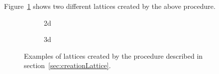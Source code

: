 
Figure~\ref{fig:examplesLattices} shows two different lattices created by the above procedure.

\begin{figure}
    \centering
    \begin{subfigure}[t]{0.4\textwidth}
        \centering
        \caption{2d}
    \end{subfigure}
    \hfill
    \begin{subfigure}[t]{0.4\textwidth}
        \centering
        \caption{3d}
    \end{subfigure}
    \caption{Examples of lattices created by the procedure described in section~\ref{sec:creationLattice}. }
    \label{fig:examplesLattices}
\end{figure}

